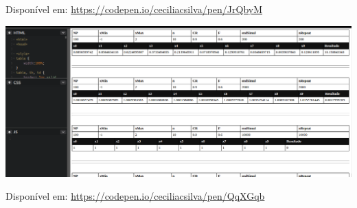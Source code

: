\documentclass[11pt]{article}
\begin{document}
Disponível em: \url{https://codepen.io/ceciliacsilva/pen/JrQbyM}

\includegraphics[width=.9\linewidth]{img/rosenbrock3.png}

Disponível em: \url{https://codepen.io/ceciliacsilva/pen/QqXGqb}
\end{document}

